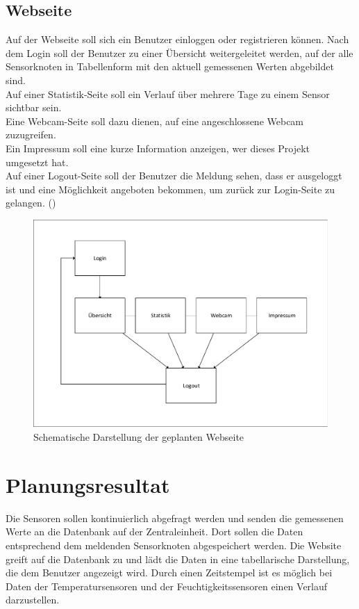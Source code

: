 \subsection{Webseite}\label{sub:Webseite}

Auf der Webseite soll sich ein Benutzer einloggen oder registrieren können.
Nach dem Login soll der Benutzer zu einer Übersicht weitergeleitet werden, auf der alle Sensorknoten in Tabellenform mit den aktuell gemessenen Werten abgebildet sind. \\
Auf einer Statistik-Seite soll ein Verlauf über mehrere Tage zu einem Sensor sichtbar sein.\\
Eine Webcam-Seite soll dazu dienen, auf eine angeschlossene Webcam zuzugreifen.\\
Ein Impressum soll eine kurze Information anzeigen, wer dieses Projekt umgesetzt hat.\\
Auf einer Logout-Seite soll der Benutzer die Meldung sehen, dass er ausgeloggt ist und eine Möglichkeit angeboten bekommen, um zurück zur Login-Seite zu gelangen.
()

\begin{figure} [htb]
\begin{centering}
\includegraphics[scale=0.8]{Bilder/Kapitel3/struktur_website_einfach.pdf}
\caption[Schematische Darstellung der geplanten Webseite]{Schematische
Darstellung der geplanten Webseite}
\label{Darstellung_Website_einfach}
\end{centering}
\end{figure}

\section{Planungsresultat}

Die Sensoren sollen kontinuierlich abgefragt werden und senden die gemessenen Werte an
die Datenbank auf der Zentraleinheit. Dort sollen die Daten entsprechend dem
meldenden Sensorknoten abgespeichert werden. Die Website greift auf die Datenbank zu
und lädt die Daten in eine tabellarische Darstellung, die dem Benutzer angezeigt wird. Durch einen Zeitstempel ist es möglich bei Daten der Temperatursensoren
und der Feuchtigkeitssensoren einen Verlauf darzustellen.
